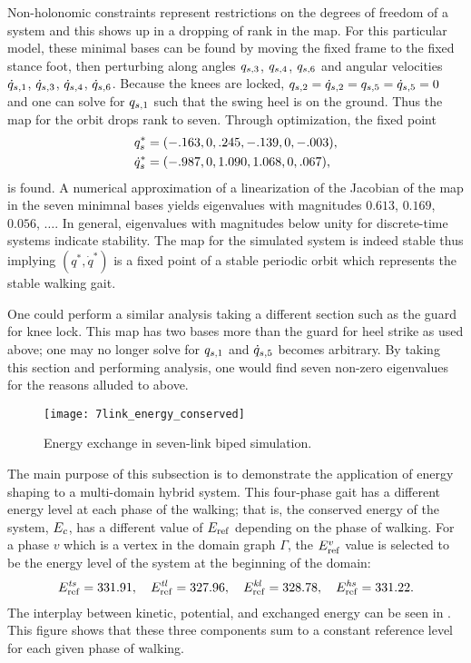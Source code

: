 Non-holonomic constraints represent restrictions on the degrees of freedom of a
system and this shows up in a dropping of rank in the \Poincare{} map.
%
For this particular model, these minimal bases can be found by moving the fixed
frame to the fixed stance foot, then perturbing along angles $q_{s,3}$,
$q_{s,4}$, $q_{s,6}$ and angular velocities $\dot{q}_{s,1}$, $\dot{q}_{s,3}$, $\dot{q}_{s,4}$,
$\dot{q}_{s,6}$.
%
Because the knees are locked, $q_{s,2} = \dot{q}_{s,2} = q_{s,5} = \dot{q}_{s,5} = 0$ and
one can solve for $q_{s,1}$ such that the swing heel is on the ground.
%
Thus the \Poincare{} map for the orbit drops rank to seven.
%
Through optimization, the fixed point
\begin{align*}
  q_{s}^{*} &= (-.163, 0, .245, -.139, 0, -.003),\\
  \dot{q}_{s}^{*} &= (-.987, 0, 1.090, 1.068, 0, .067),
\end{align*}
is found.
%
A numerical approximation of a linearization of the Jacobian of the \Poincare{}
map in the seven minimnal bases yields eigenvalues with magnitudes $0.613$,
$0.169$, $0.056$, $\ldots$.
%
In general, eigenvalues with magnitudes below unity for discrete-time systems
indicate stability.
%
The \Poincare{} map for the simulated system is indeed stable thus implying
$(q^*, \dot q^*)$ is a fixed point of a stable periodic orbit which represents
the stable walking gait.

One could perform a similar analysis taking a different \Poincare{} section such
as the guard for knee lock.
%
This map has two bases more than the guard for heel strike as used above;
%
one may no longer solve for $q_{s,1}$ and $\dot{q}_{s,5}$ becomes arbitrary.
%
By taking this \Poincare{} section and performing analysis, one would find seven
non-zero eigenvalues for the reasons alluded to above.

\begin{figure}[t!]
  \centering
  \texttt{[image: 7link\_energy\_conserved]}
  \caption[Energy exchange in seven-link biped simulation.]{Energy exchange in
    seven-link biped simulation.}
  \label{fig:7link_energy_conserved}
\end{figure}

The main purpose of this subsection is to demonstrate the application of energy
shaping to a multi-domain hybrid system.
%
This four-phase gait has a different energy level at each phase of the
walking; that is, the conserved energy of the system, $E_{c}$, has a different
value of $E_{\mathrm{ref}}$ depending on the phase of walking.
%
For a phase $v$ which is a vertex in the domain graph $\Gamma$, the $E_{\mathrm{ref}}^v$
value is selected to be the energy level of the system at the beginning of the
domain:
%
\begin{align*}
  E_{\mathrm{ref}}^{\mathit{ts}} = 331.91, \quad
  E_{\mathrm{ref}}^{\mathit{tl}} = 327.96, \quad
  E_{\mathrm{ref}}^{\mathit{kl}} = 328.78, \quad
  E_{\mathrm{ref}}^{\mathit{hs}} = 331.22.
\end{align*}
%
The interplay between kinetic, potential, and exchanged energy can be seen in
.
%
This figure shows that these three components sum to a constant reference level
for each given phase of walking.


